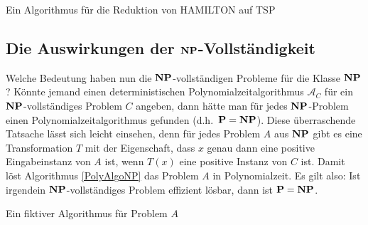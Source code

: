 \begin{algorithm}
\caption{Ein Algorithmus für die Reduktion von \textsf{HAMILTON} auf \textsf{TSP}}
\label{TSPRed}
\BlankLine
{}
\end{algorithm}

\subsection{Die Auswirkungen der $\mathbf{N}\mathbf{P}$-Vollständigkeit}
Welche Bedeutung haben nun die $\mathbf{N}\mathbf{P}$-vollständigen Probleme für die
Klasse $\mathbf{N}\mathbf{P}$? Könnte jemand einen deterministischen
Polynomialzeitalgorithmus $\mathcal{A}_C$ für ein
$\mathbf{N}\mathbf{P}$-voll\-ständiges Problem $C$ angeben, dann hätte man für jedes
$\mathbf{N}\mathbf{P}$-Problem einen Polynomialzeitalgorithmus gefunden
(d.h.~$\mathbf{P}=\mathbf{N}\mathbf{P}$). Diese überraschende Tatsache lässt sich leicht
einsehen, denn für jedes Problem $A$ aus $\mathbf{N}\mathbf{P}$ gibt es eine
Transformation $T$ mit der Eigenschaft, dass $x$ genau dann eine
positive Eingabeinstanz von $A$ ist, wenn $T(x)$ eine positive Instanz
von $C$ ist. Damit löst Algorithmus \ref{PolyAlgoNP} das Problem $A$
in Polynomialzeit. Es gilt also: Ist irgendein $\mathbf{N}\mathbf{P}$-vollständiges
Problem effizient lösbar, dann ist $\mathbf{P}=\mathbf{N}\mathbf{P}$.

\begin{algorithm}
\caption{Ein fiktiver Algorithmus für Problem $A$}
\label{PolyAlgoNP}
\BlankLine
{}
\end{algorithm}

